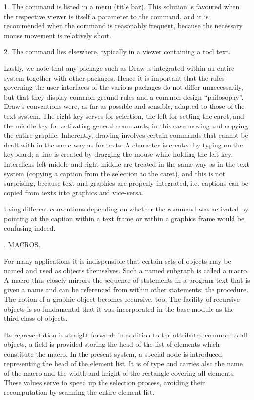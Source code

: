 \item{1.} The command is listed in a menu (title bar). This solution is favoured when the respective viewer is itself a parameter to the command, and it is recommended when the command is reasonably frequent, because the necessary mouse movement is relatively short.
\item{2.} The command lies elsewhere, typically in a viewer containing a tool text.

Lastly, we note that any package such as Draw is integrated within an entire system together with other packages. Hence it is important that the rules governing the user interfaces of the various packages do not differ unnecessarily, but that they display common ground rules and a common design ``philosophy''. Draw's conventions were, as far as possible and sensible, adapted to those of the text system. The right key serves for selection, the left for setting the caret, and the middle key for activating general commands, in this case moving and copying the entire graphic. Inherently, drawing involves certain commands that cannot be dealt with in the same way as for texts. A character is created by typing on the keyboard; a line is created by dragging the mouse while holding the left key. Interclicks left-middle and right-middle are treated in the same way as in the text system (copying a caption from the selection to the caret), and this is not surprising, because text and graphics are properly integrated, i.e. captions can be copied from texts into graphics and vice-versa.

Using different conventions depending on whether the command was activated by pointing at the caption within a text frame or within a graphics frame would be confusing indeed.

. MACROS.

For many applications it is indispensible that certain sets of objects may be named and used as objects themselves. Such a named subgraph is called a macro. A macro thus closely mirrors the sequence of statements in a program text that is given a name and can be referenced from within other statements: the procedure. The notion of a graphic object becomes recursive, too. The facility of recursive objects is so fundamental that it was incorporated in the base module  as the third class of objects.

Its representation is straight-forward: in addition to the attributes common to all objects, a field is provided storing the head of the list of elements which constitute the macro. In the present system, a special node is introduced representing the head of the element list. It is of type  and carries also the name of the macro and the width and height of the rectangle covering all elements. These values serve to speed up the selection process, avoiding their recomputation by scanning the entire element list.

